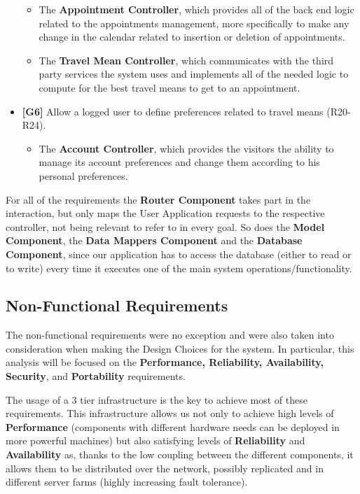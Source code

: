 \documentclass[12pt]{article}
\begin{document}
\begin{itemize}
    \begin{itemize}
        \item The \textbf{Appointment Controller}, which provides all of the back end logic related to the appointments management, more specifically to make any change in the calendar related to insertion or deletion of appointments.
        \item The \textbf{Travel Mean Controller}, which communicates with the third party services the system uses and implements all of the needed logic to compute for the best travel means to get to an appointment.
    \end{itemize}
    \item \textbf{{[G6]}} Allow a logged user to define preferences related to travel means (R20-R24).
    \begin{itemize}
        \item The \textbf{Account Controller}, which provides the visitors the ability to manage its account preferences and change them according to his personal preferences.
    \end{itemize}
\end{itemize}
For all of the requirements the \textbf{Router Component} takes part in the interaction, but only maps the User Application requests to the respective controller, not being relevant to refer to in every goal. So does the \textbf{Model Component}, the \textbf{Data Mappers Component} and the \textbf{Database Component}, since our application has to access the database (either to read or to write) every time it executes one of the main system operations/functionality.

\subsection{Non-Functional Requirements}

The non-functional requirements were no exception and were also taken into consideration when making the Design Choices for the system. In particular, this analysis will be focused on the \textbf{Performance, Reliability, Availability, Security}, and \textbf{Portability} requirements.

The usage of a 3 tier infrastructure is the key to achieve most of these requirements. This infrastructure allows us not only to achieve high levels of \textbf{Performance} (components with different hardware needs can be deployed in more powerful machines) but also satisfying levels of \textbf{Reliability} and \textbf{Availability} as, thanks to the low coupling between the different components, it allows them to be distributed over the network, possibly replicated and in different server farms (highly increasing fault tolerance).
\end{document}
